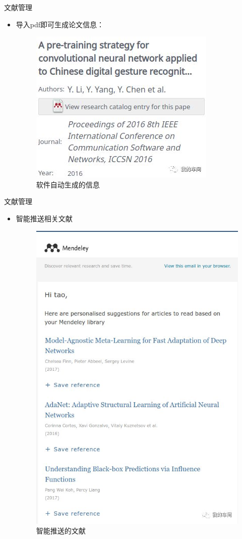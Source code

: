 \documentclass[presentation]{beamer}
\begin{document}
\begin{frame}{文献管理}
    \begin{itemize}
        \item 导入pdf即可生成论文信息：
        \begin{figure}
            \centering
              \includegraphics[width=0.5\linewidth]{_14.png}
              \caption{软件自动生成的信息}
        \end{figure}
    \end{itemize}
\end{frame}
\begin{frame}{文献管理}
    \begin{itemize}
        \item 智能推送相关文献
        \begin{figure}
            \centering
              \includegraphics[width=0.3\linewidth]{_15.png}
              \caption{智能推送的文献}
        \end{figure}
    \end{itemize}
\end{frame}
\end{document}
